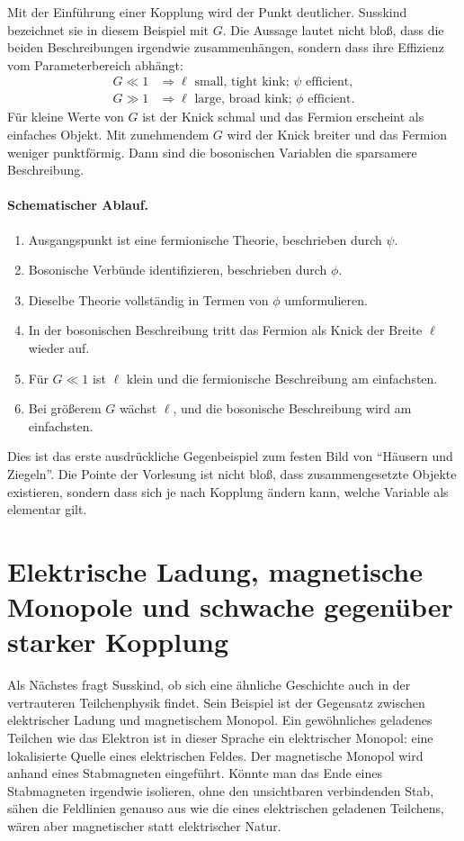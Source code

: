 Mit der Einführung einer Kopplung wird der Punkt deutlicher. Susskind bezeichnet sie in diesem Beispiel mit \(G\). Die Aussage lautet nicht bloß, dass die beiden Beschreibungen irgendwie zusammenhängen, sondern dass ihre Effizienz vom Parameterbereich abhängt:
\begin{align}
G \ll 1
&\Rightarrow
\ell\text{ small, tight kink; }\psi\text{ efficient},\\
G \gg 1
&\Rightarrow
\ell\text{ large, broad kink; }\phi\text{ efficient}.
\end{align}
Für kleine Werte von \(G\) ist der Knick schmal und das Fermion erscheint als einfaches Objekt. Mit zunehmendem \(G\) wird der Knick breiter und das Fermion weniger punktförmig. Dann sind die bosonischen Variablen die sparsamere Beschreibung.

\paragraph{Schematischer Ablauf.}
\begin{enumerate}
\item Ausgangspunkt ist eine fermionische Theorie, beschrieben durch \(\psi\).
\item Bosonische Verbünde identifizieren, beschrieben durch \(\phi\).
\item Dieselbe Theorie vollständig in Termen von \(\phi\) umformulieren.
\item In der bosonischen Beschreibung tritt das Fermion als Knick der Breite \(\ell\) wieder auf.
\item Für \(G\ll 1\) ist \(\ell\) klein und die fermionische Beschreibung am einfachsten.
\item Bei größerem \(G\) wächst \(\ell\), und die bosonische Beschreibung wird am einfachsten.
\end{enumerate}

Dies ist das erste ausdrückliche Gegenbeispiel zum festen Bild von ``Häusern und Ziegeln''. Die Pointe der Vorlesung ist nicht bloß, dass zusammengesetzte Objekte existieren, sondern dass sich je nach Kopplung ändern kann, welche Variable als elementar gilt.

\section{Elektrische Ladung, magnetische Monopole und schwache gegenüber starker Kopplung}

Als Nächstes fragt Susskind, ob sich eine ähnliche Geschichte auch in der vertrauteren Teilchenphysik findet. Sein Beispiel ist der Gegensatz zwischen elektrischer Ladung und magnetischem Monopol. Ein gewöhnliches geladenes Teilchen wie das Elektron ist in dieser Sprache ein elektrischer Monopol: eine lokalisierte Quelle eines elektrischen Feldes. Der magnetische Monopol wird anhand eines Stabmagneten eingeführt. Könnte man das Ende eines Stabmagneten irgendwie isolieren, ohne den unsichtbaren verbindenden Stab, sähen die Feldlinien genauso aus wie die eines elektrischen geladenen Teilchens, wären aber magnetischer statt elektrischer Natur.

